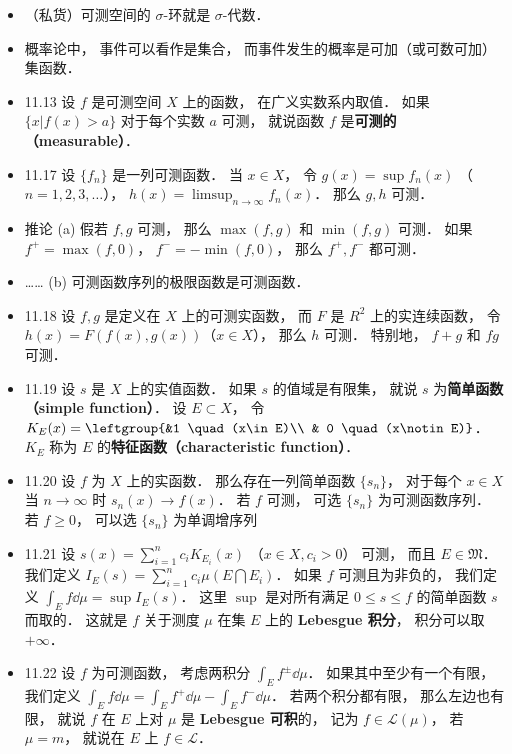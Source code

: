 \begin{itemize}
\item （私货）可测空间的 $\sigma$-环就是 $\sigma$-代数．

\item 概率论中， 事件可以看作是集合， 而事件发生的概率是可加（或可数可加）集函数．

\item 11.13 设 $f$ 是可测空间 $X$ 上的函数， 在广义实数系内取值． 如果 $\{x|f(x)>a\}$ 对于每个实数 $a$ 可测， 就说函数 $f$ 是\textbf{可测的（measurable）}．

\item 11.17 设 $\{f_n\}$ 是一列可测函数． 当 $x\in X$， 令 $g(x)=\sup f_n(x)$ （$n=1,2,3,\dots$）， $h(x)=\limsup_{n\to\infty} f_n(x)$． 那么 $g,h$ 可测．

\item 推论 (a) 假若 $f,g$ 可测， 那么 $\max(f,g)$ 和 $\min(f,g)$ 可测． 如果 $f^+=\max(f,0)$， $f^-=-\min(f,0)$， 那么 $f^+,f^-$ 都可测．

\item …… (b) 可测函数序列的极限函数是可测函数．

\item 11.18 设 $f,g$ 是定义在 $X$ 上的可测实函数， 而 $F$ 是 $R^2$ 上的实连续函数， 令 $h(x)=F(f(x),g(x))$（$x\in X$）， 那么 $h$ 可测． 特别地， $f+g$ 和 $fg$ 可测．

\item 11.19 设 $s$ 是 $X$ 上的实值函数． 如果 $s$ 的值域是有限集， 就说 $s$ 为\textbf{简单函数（simple function）}． 设 $E\subset X$， 令 $K_E(x)=\leftgroup{&1 \quad  (x\in E)\\ & 0 \quad (x\notin E)}$． $K_E$ 称为 $E$ 的\textbf{特征函数（characteristic function）}．

\item 11.20 设 $f$ 为 $X$ 上的实函数． 那么存在一列简单函数 $\{s_n\}$， 对于每个 $x\in X$ 当 $n\to\infty$ 时 $s_n(x)\to f(x)$． 若 $f$ 可测， 可选 $\{s_n\}$ 为可测函数序列． 若 $f\geqslant 0$， 可以选 $\{s_n\}$ 为单调增序列

\item 11.21 设 $s(x) = \sum_{i=1}^n c_i K_{E_i}(x)$ （$x\in X, c_i>0$） 可测， 而且 $E\in \mathfrak M$． 我们定义 $I_E(s) = \sum_{i=1}^n c_i \mu(E\bigcap E_i)$． 如果 $f$ 可测且为非负的， 我们定义 $\int_E f\dd{\mu} = \sup I_E(s)$． 这里 $\sup$ 是对所有满足 $0\leqslant s\leqslant f$ 的简单函数 $s$ 而取的． 这就是 $f$ 关于测度 $\mu$ 在集 $E$ 上的 \textbf{Lebesgue 积分}， 积分可以取 $+\infty$．

\item 11.22 设 $f$ 为可测函数， 考虑两积分 $\int_E f^\pm \dd{\mu}$． 如果其中至少有一个有限， 我们定义 $\int_E f\dd{\mu} = \int_E f^+\dd{\mu} - \int_E f^-\dd{\mu}$． 若两个积分都有限， 那么左边也有限， 就说 $f$ 在 $E$ 上对 $\mu$ 是 \textbf{Lebesgue 可积}的， 记为 $f\in \mathscr L(\mu)$， 若 $\mu=m$， 就说在 $E$ 上 $f\in \mathscr L$．


\end{itemize}
